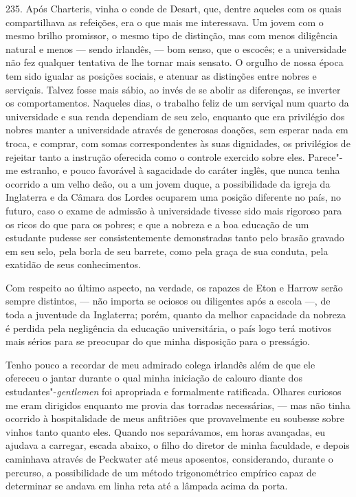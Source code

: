 235. Após Charteris, vinha o conde de Desart, que, dentre aqueles com os
quais compartilhava as refeições, era o que mais me interessava. Um
jovem com o mesmo brilho promissor, o mesmo tipo de distinção, mas com
menos diligência natural e menos --- sendo irlandês, --- bom senso, que o
escocês; e a universidade não fez qualquer tentativa de lhe tornar mais
sensato. O orgulho de nossa época tem sido igualar as posições sociais,
e atenuar as distinções entre nobres e serviçais. Talvez fosse mais
sábio, ao invés de se abolir as diferenças, se inverter os
comportamentos. Naqueles dias, o trabalho feliz de um serviçal num
quarto da universidade e sua renda dependiam de seu zelo, enquanto que
era privilégio dos nobres manter a universidade através de generosas
doações, sem esperar nada em troca, e comprar, com somas correspondentes
às suas dignidades, os privilégios de rejeitar tanto a instrução
oferecida como o controle exercido sobre eles. Parece"-me estranho, e
pouco favorável à sagacidade do caráter inglês, que nunca tenha ocorrido
a um velho deão, ou a um jovem duque, a possibilidade da igreja da
Inglaterra e da Câmara dos Lordes ocuparem uma posição diferente no
país, no futuro, caso o exame de admissão à universidade tivesse sido
mais rigoroso para os ricos do que para os pobres; e que a nobreza e a
boa educação de um estudante pudesse ser consistentemente demonstradas
tanto pelo brasão gravado em seu selo, pela borla de seu barrete, como
pela graça de sua conduta, pela exatidão de seus conhecimentos.

Com respeito ao último aspecto, na verdade, os rapazes de Eton e Harrow
serão sempre distintos, --- não importa se ociosos ou diligentes após a
escola ---, de toda a juventude da Inglaterra; porém, quanto da melhor
capacidade da nobreza é perdida pela negligência da educação
universitária, o país logo terá motivos mais sérios para se preocupar do
que minha disposição para o presságio.

Tenho pouco a recordar de meu admirado colega irlandês além de que ele
ofereceu o jantar durante o qual minha iniciação de calouro diante dos
estudantes"-\emph{gentlemen} foi apropriada e formalmente ratificada.
Olhares curiosos me eram dirigidos enquanto me provia das torradas
necessárias, --- mas não tinha ocorrido à hospitalidade de meus
anfitriões que provavelmente eu soubesse sobre vinhos tanto quanto eles.
Quando nos separávamos, em horas avançadas, eu ajudava a carregar,
escada abaixo, o filho do diretor de minha faculdade, e depois caminhava
através de Peckwater até meus aposentos, considerando, durante o
percurso, a possibilidade de um método trigonométrico empírico capaz de
determinar se andava em linha reta até a lâmpada acima da porta.

